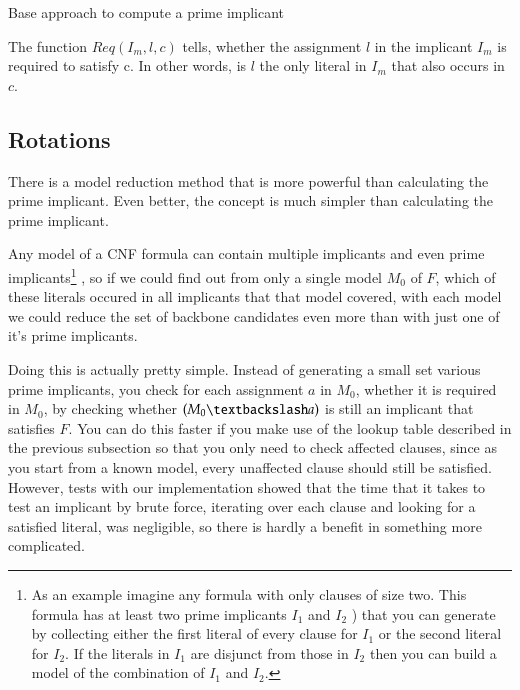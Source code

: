 \begin{algorithm}
\caption{{\sc Base approach to compute a prime implicant }}
\DontPrintSemicolon
{}

\;

\end{algorithm}

The function $Req(I_m,l,c)$ tells, whether the assignment $l$ in the implicant $I_m$ is required to satisfy c. In other words, is $l$ the only literal in $I_m$ that also occurs in $c$.

\subsection{Rotations}
There is a model reduction method that is more powerful than calculating the prime implicant. Even better, the concept is much simpler than calculating the prime implicant. 

Any model of a CNF formula can contain multiple implicants and even prime implicants\footnote{As an example imagine any formula with only clauses of size two. This formula has at least two prime implicants $I_1$ and $I_2$ ) that you can generate by collecting either the first literal of every clause for $I_1$ or the second literal for $I_2$. If the literals in $I_1$ are disjunct from those in $I_2$ then you can build a model of the combination of $I_1$ and $I_2$.}
, so if we could find out from only a single model $M_0$ of $F$, which of these literals occured in all implicants that that model covered, with each model we could reduce the set of backbone candidates even more than with just one of it's prime implicants.

Doing this is actually pretty simple. Instead of generating a small set various prime implicants, you check for each assignment $a$ in $M_0$, whether it is required in $M_0$, by checking whether $(M_0 \textbackslash a)$ is still an implicant that satisfies $F$. You can do this faster if you make use of the lookup table described in the previous subsection so that you only need to check affected clauses, since as you start from a known model, every unaffected clause should still be satisfied. However, tests with our implementation showed that the time that it takes to test an implicant by brute force, iterating over each clause and looking for a satisfied literal, was negligible, so there is hardly a benefit in something more complicated.


